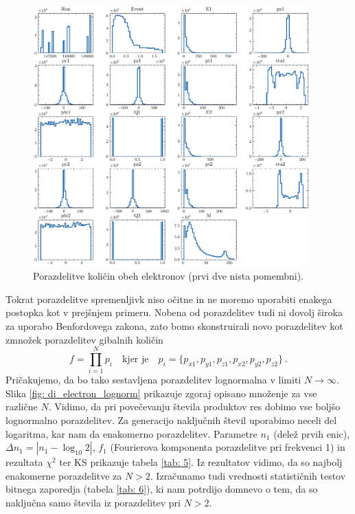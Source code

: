 \documentclass[11pt, oneside]{article}
\theoremstyle{definition}
\begin{document}
\newpage

\begin{figure}[h!]
    \centering
    \includegraphics[width=0.95\textwidth]{dielectron_hists.pdf}
    \caption{Porazdelitve količin obeh elektronov (prvi dve nista pomembni).}
    \label{fig: di_electron}
\end{figure}

\noindent
Tokrat porazdelitve spremenljivk niso očitne in ne moremo uporabiti enakega postopka kot v prejšnjem primeru.
Nobena od porazdelitev tudi ni dovolj široka za uporabo Benfordovega zakona, zato bomo skonstruirali novo
porazdelitev kot zmnožek porazdelitev gibalnih količin
\begin{equation}
    f = \prod_{i=1}^N p_i \quad \text{kjer je} \quad p_i = \{p_{x1}, p_{y1}, p_{z1}, p_{x2}, p_{y2}, p_{z2}\} \>.
\end{equation}
Pričakujemo, da bo tako sestavljena porazdelitev lognormalna v limiti $N \rightarrow \infty$.
Slika \ref{fig: di_electron_lognorm} prikazuje zgoraj opisano množenje za vse različne $N$.
Vidimo, da pri povečevanju števila produktov res dobimo vse boljšo lognormalno porazdelitev.
Za generacijo naključnih števil uporabimo neceli del logaritma, kar nam da enakomerno porazdelitev.
Parametre $n_1$ (delež prvih enic), $\Delta n_1 = |n_1 - \log_{10} 2|$, $f_1$ (Fourierova komponenta porazdelitve pri
frekvenci 1) in rezultata $\chi^2$ ter KS prikazuje tabela \ref{tab: 5}.
Iz rezultatov vidimo, da so najbolj enakomerne porazdelitve za $N > 2$.
Izračunamo tudi vrednosti statističnih testov bitnega zaporedja (tabela \ref{tab: 6}), ki nam potrdijo domnevo o tem, da
so naključna samo števila iz porazdelitev pri $N > 2$.
\end{document}
